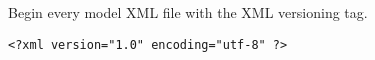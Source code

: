 \subsection{}

Begin every model XML file with the XML versioning tag.

\begin{verbatim}
<?xml version="1.0" encoding="utf-8" ?>
\end{verbatim}
